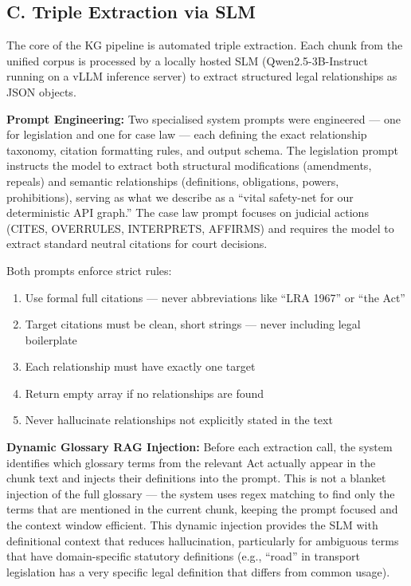 \documentclass[10pt, a4paper, twocolumn]{article}
\begin{document}
\subsection{C. Triple Extraction via SLM}
The core of the KG pipeline is automated triple extraction. Each chunk from the unified corpus is processed by a locally hosted SLM (Qwen2.5-3B-Instruct running on a vLLM inference server) to extract structured legal relationships as JSON objects.

\textbf{Prompt Engineering:} Two specialised system prompts were engineered — one for legislation and one for case law — each defining the exact relationship taxonomy, citation formatting rules, and output schema. The legislation prompt instructs the model to extract both structural modifications (amendments, repeals) and semantic relationships (definitions, obligations, powers, prohibitions), serving as what we describe as a ``vital safety-net for our deterministic API graph.'' The case law prompt focuses on judicial actions (CITES, OVERRULES, INTERPRETS, AFFIRMS) and requires the model to extract standard neutral citations for court decisions.

Both prompts enforce strict rules:
\begin{enumerate}
    \item Use formal full citations — never abbreviations like ``LRA 1967'' or ``the Act''
    \item Target citations must be clean, short strings — never including legal boilerplate
    \item Each relationship must have exactly one target
    \item Return empty array if no relationships are found
    \item Never hallucinate relationships not explicitly stated in the text
\end{enumerate}

\textbf{Dynamic Glossary RAG Injection:} Before each extraction call, the system identifies which glossary terms from the relevant Act actually appear in the chunk text and injects their definitions into the prompt. This is not a blanket injection of the full glossary — the system uses regex matching to find only the terms that are mentioned in the current chunk, keeping the prompt focused and the context window efficient. This dynamic injection provides the SLM with definitional context that reduces hallucination, particularly for ambiguous terms that have domain-specific statutory definitions (e.g., ``road'' in transport legislation has a very specific legal definition that differs from common usage).
\end{document}
